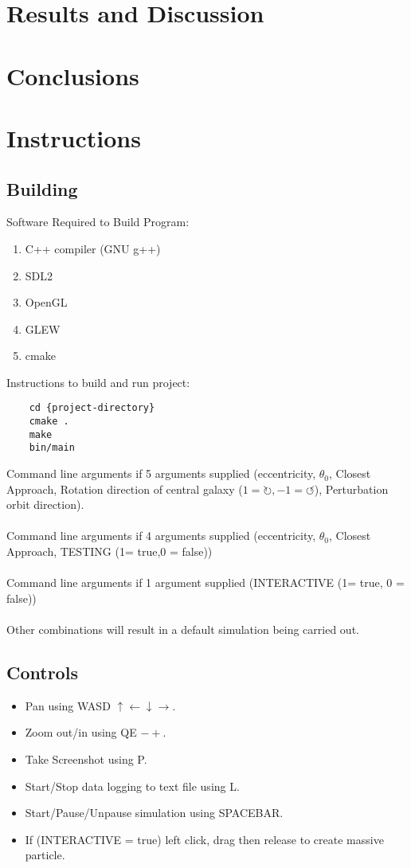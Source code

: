 \documentclass[10pt,a4paper]{article}
\begin{document}
\clearpage
\section{Results and Discussion}


\clearpage
\section{Conclusions}

\clearpage
\section{Instructions}
\subsection{Building}
Software Required to Build Program:
\\
\begin{enumerate}
\item C++ compiler (GNU g++)
\item SDL2
\item OpenGL
\item GLEW
\item cmake
\end{enumerate}

Instructions to build and run project:

\begin{lstlisting}
	cd {project-directory}
	cmake .
	make
	bin/main
\end{lstlisting}
Command line arguments if 5 arguments supplied (eccentricity, $\theta_0$, Closest Approach, Rotation direction of central galaxy ($1=\circlearrowright, -1=\circlearrowleft$), Perturbation orbit direction).
\\
\\
Command line arguments if 4 arguments supplied (eccentricity, $\theta_0$, Closest Approach, TESTING (1= true,0 = false))
\\
\\
Command line arguments if 1 argument supplied (INTERACTIVE (1= true, 0 = false))
\\
\\
Other combinations will result in a default simulation being carried out.

\subsection{Controls}
\begin{itemize}
\item Pan using WASD $\uparrow \leftarrow \downarrow \rightarrow$.
\item Zoom out/in using QE $-+$.
\item Take Screenshot using P.
\item Start/Stop data logging to text file using L.
\item Start/Pause/Unpause simulation using SPACEBAR.
\item If (INTERACTIVE = true) left click, drag then release to create massive particle.
\end{itemize}
\end{document}
